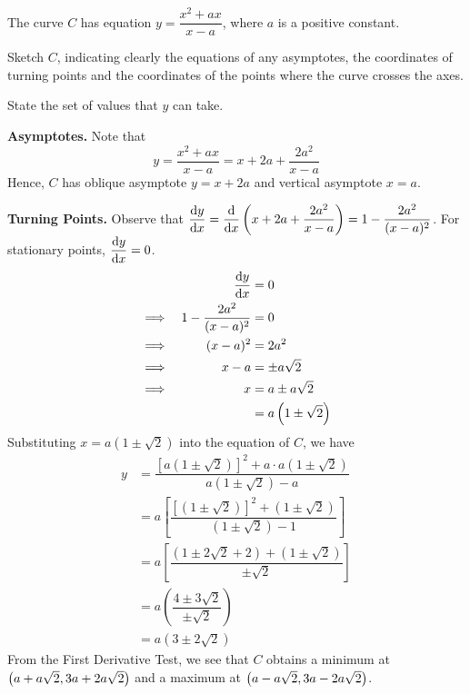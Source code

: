 \documentclass{echw}
\begin{document}

    \problem{}
        The curve $C$ has equation $y = \dfrac{x^2 + ax}{x - a}$, where $a$ is a positive constant.

        \medskip

        \noindent Sketch $C$, indicating clearly the equations of any asymptotes, the coordinates of turning points and the coordinates of the points where the curve crosses the axes.

        \medskip

        \noindent State the set of values that $y$ can take.

    \solution
        \textbf{Asymptotes.} Note that
        \begin{equation*}
            y = \dfrac{x^2 + ax}{x-a} = x + 2a + \dfrac{2a^2}{x-a}
        \end{equation*}
        Hence, $C$ has oblique asymptote $y = x + 2a$ and vertical asymptote $x = a$.

        \medskip

        \noindent \textbf{Turning Points.} Observe that $\dfrac{\mathrm{d} y}{\mathrm{d} x} = \dfrac{\mathrm{d} }{\mathrm{d} x} \left(x + 2a + \dfrac{2a^2}{x-a}\right) = 1 - \dfrac{2a^2}{(x-a)^2}$. For stationary points, $\dfrac{\mathrm{d} y}{\mathrm{d} x} = 0$.
        \begin{alignat*}{2}
            &&\dfrac{\mathrm{d} y}{\mathrm{d} x} &= 0\\
            \implies&&1 - \dfrac{2a^2}{(x-a)^2} &= 0\\
            \implies&&(x-a)^2 &= 2a^2\\
            \implies&&x-a &= \pm a\sqrt2\\
            \implies&&x &= a \pm a\sqrt2\\
            && &= a\left(1 \pm \sqrt2\right)
        \end{alignat*}
        Substituting $x = a\left(1 \pm \sqrt2\right)$ into the equation of $C$, we have
        \begin{align*}
            y &= \dfrac{\left[a\left(1 \pm \sqrt2\right)\right]^2 + a\cdot a\left(1 \pm \sqrt2\right)}{a\left(1 \pm \sqrt2\right) - a}\\
            &= a \left[\dfrac{\left[\left(1 \pm \sqrt2\right)\right]^2 + \left(1 \pm \sqrt2\right)}{\left(1 \pm \sqrt2\right) - 1}\right]\\
            &= a \left[\dfrac{\left(1 \pm 2\sqrt2 + 2\right) + \left(1 \pm \sqrt2\right)}{\pm \sqrt2}\right]\\
            &= a \left(\dfrac{4 \pm 3\sqrt2}{\pm \sqrt2}\right)\\
            &= a\left(3 \pm 2\sqrt2\right)
        \end{align*}
        From the First Derivative Test, we see that $C$ obtains a minimum at $\left(a + a\sqrt2, 3a + 2a\sqrt2\right)$ and a maximum at $\left(a - a\sqrt2, 3a - 2a\sqrt2\right)$. 
\end{document}

